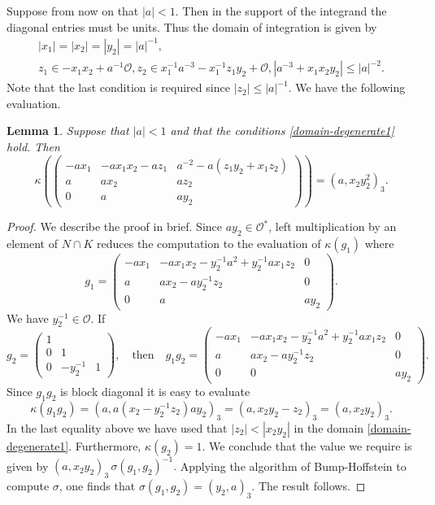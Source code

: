 \documentclass[12pt]{amsart}
\newcommand{\abs}[1]{\left|{#1}\right|}
\renewcommand{\O}{\mathcal{O}}
\newtheorem{lemma}[theorem]{Lemma}
\theoremstyle{remark}
\begin{document}
Suppose from now on that $|a|<1$. Then in the support of the integrand the diagonal entries must be units.
Thus the domain of integration is given by
\begin{multline}\label{domain-degenerate1}
\abs{x_1}=\abs{x_2}=\abs{y_2}=\abs{a}^{-1},\\ z_1\in -x_1x_2+a^{-1}\O, z_2\in x_1^{-1}a^{-3}-x_1^{-1}z_1y_2+\O, \abs{a^{-3}+x_1x_2y_2}\leq \abs{a}^{-2}.
\end{multline}
Note that the last condition is required since $\abs{z_2}\leq \abs{a}^{-1}$.
We have the following evaluation.
\begin{lemma}\label{first-kappa} Suppose that $\abs{a}<1$ and that the conditions \eqref{domain-degenerate1} hold.  Then
$$\kappa\left(\begin{pmatrix}-ax_1&-ax_1x_2-az_1&a^{-2}-a(z_1y_2+x_1z_2)\\a&ax_2&az_2\\0&a&ay_2\end{pmatrix}\right)=(a,x_2y_2^2)_3.$$
\end{lemma}

\begin{proof}We describe the proof in brief. Since $ay_2\in\O^*$, left multiplication by an element of $N\cap K$ reduces the computation to the evaluation of $\kappa(g_1)$
where
$$g_1=\begin{pmatrix}-ax_1&-ax_1x_2-y_2^{-1}a^2+y_2^{-1}ax_1z_2&0\\a&ax_2-ay_2^{-1}z_2&0\\0&a&ay_2\end{pmatrix}.$$
We have $y_2^{-1}\in\O$. If
$$g_2=\begin{pmatrix}1&&\\0&1\\0&-y_2^{-1}&1\end{pmatrix},\quad\text{then}\quad
g_1g_2=\begin{pmatrix}-ax_1&-ax_1x_2-y_2^{-1}a^2+y_2^{-1}ax_1z_2&0\\a&ax_2-ay_2^{-1}z_2&0\\0&0&ay_2\end{pmatrix}.$$
Since $g_1g_2$ is block diagonal it is easy to evaluate 
$$
\kappa(g_1g_2)=(a,a(x_2-y_2^{-1}z_2)ay_2)_3=(a,x_2y_2-z_2)_3=(a,x_2y_2)_3.
$$
In the last equality above we have used that $\abs{z_2}<\abs{x_2y_2}$ in the domain \eqref{domain-degenerate1}. Furthermore, $\kappa(g_2)=1$. We conclude that the value we require is given by
$(a,x_2y_2)_3 \, \sigma(g_1,g_2)^{-1}.$
Applying the algorithm of Bump-Hoffstein to compute $\sigma$, one finds that $\sigma(g_1,g_2)=(y_2,a)_3$.  The result follows.
\end{proof}
\end{document}
